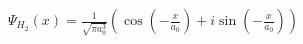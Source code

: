 \documentclass[preview]{standalone}
\begin{document}
\begin{center}
$\Psi_{H_2}(x) = \frac{1}{\sqrt{\pi a_0^3}}(\cos(-\frac{x}{a_0})+i\sin(-\frac{x}{a_0})) $
\end{center}
\end{document}
